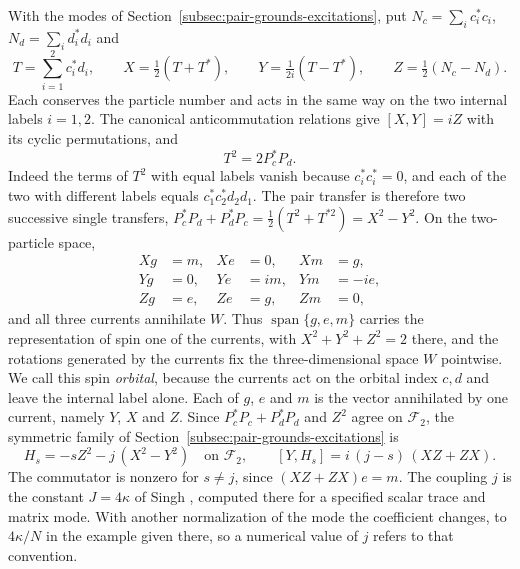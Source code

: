 \documentclass[11pt]{article}
\theoremstyle{definition}
\DeclareMathOperator{\Span}{span}
\begin{document}
With the modes of Section~\ref{subsec:pair-grounds-excitations}, put $N_c=\sum_ic_i^*c_i$, $N_d=\sum_id_i^*d_i$ and
\begin{equation}
 T=\sum_{i=1}^2c_i^*d_i,\qquad X=\tfrac12(T+T^*),\qquad Y=\tfrac1{2i}(T-T^*),\qquad Z=\tfrac12(N_c-N_d).
 \label{eq:pair-currents}
\end{equation}
Each conserves the particle number and acts in the same way on the two internal labels $i=1,2$. The canonical anticommutation relations give $[X,Y]=iZ$ with its cyclic permutations, and
\begin{equation}
 T^2=2P_c^*P_d .
 \label{eq:pair-currents-square}
\end{equation}
Indeed the terms of $T^2$ with equal labels vanish because $c_i^*c_i^*=0$, and each of the two with different labels equals $c_1^*c_2^*d_2d_1$. The pair transfer is therefore two successive single transfers, $P_c^*P_d+P_d^*P_c=\tfrac12(T^2+T^{*2})=X^2-Y^2$. On the two-particle space,
\begin{equation}
 \begin{aligned}
 Xg&=m, & Xe&=0, & Xm&=g,\\
 Yg&=0, & Ye&=im, & Ym&=-ie,\\
 Zg&=e, & Ze&=g, & Zm&=0,
 \end{aligned}
 \label{eq:pair-currents-action}
\end{equation}
and all three currents annihilate $W$. Thus $\Span\{g,e,m\}$ carries the representation of spin one of the currents, with $X^2+Y^2+Z^2=2$ there, and the rotations generated by the currents fix the three-dimensional space $W$ pointwise. We call this spin \emph{orbital}, because the currents act on the orbital index $c,d$ and leave the internal label alone. Each of $g$, $e$ and $m$ is the vector annihilated by one current, namely $Y$, $X$ and $Z$. Since $P_c^*P_c+P_d^*P_d$ and $Z^2$ agree on $\mathcal F_2$, the symmetric family of Section~\ref{subsec:pair-grounds-excitations} is
\begin{equation}
 H_s=-sZ^2-j\,(X^2-Y^2)\quad\text{on }\mathcal F_2,\qquad
 [Y,H_s]=i\,(j-s)\,(XZ+ZX).
 \label{eq:pair-currents-hamiltonian}
\end{equation}
The commutator is nonzero for $s\ne j$, since $(XZ+ZX)e=m$. The coupling $j$ is the constant $J=4\kappa$ of Singh \cite[Eq.~(3.11)]{Singh2026PairTransfer}, computed there for a specified scalar trace and matrix mode. With another normalization of the mode the coefficient changes, to $4\kappa/N$ in the example given there, so a numerical value of $j$ refers to that convention.
\end{document}
